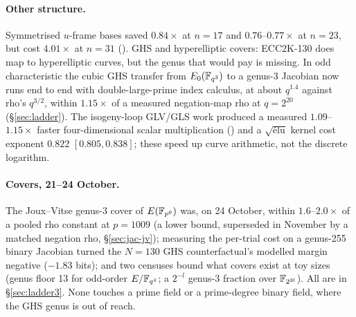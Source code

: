 \paragraph{Other structure.} Symmetrised $u$-frame bases saved
$0.84\times$ at $n=17$ and $0.76$--$0.77\times$ at $n=23$, but cost
$4.01\times$ at $n=31$ ().
GHS and hyperelliptic covers: ECC2K-130 does map to hyperelliptic curves,
but the genus that would pay is missing. In odd characteristic the cubic
GHS transfer from $E_0(\mathbb{F}_{q^3})$ to a genus-3 Jacobian now runs end to end
with double-large-prime index calculus, at about $q^{1.4}$ against rho's
$q^{3/2}$, within $1.15\times$ of a measured negation-map rho at
$q=2^{20}$ (\S\ref{sec:ladder}). The
isogeny-loop GLV/GLS work produced a measured $1.09$--$1.15\times$ faster
four-dimensional scalar multiplication ()
and a $\sqrt{\text{\'elu}}$ kernel cost exponent $0.822$ $[0.805,0.838]$;
these speed up curve arithmetic, not the discrete logarithm.

\paragraph{Covers, 21--24 October.} The Joux--Vitse genus-3 cover of
$E(\mathbb{F}_{p^6})$ was, on 24 October, within $1.6$--$2.0\times$ of a pooled rho
constant at $p=1009$ (a lower bound, superseded in November by a matched
negation rho, \S\ref{sec:jac-jv}); measuring the per-trial cost on a genus-255 binary Jacobian
turned the $N=130$ GHS counterfactual's modelled margin negative ($-1.83$
bits); and two censuses bound what covers exist at toy sizes (genus floor 13
for odd-order $E/\mathbb{F}_{q^4}$; a $2^{-l}$ genus-3 fraction over
$\mathbb{F}_{2^{3l}}$). All are in \S\ref{sec:ladder3}. None touches a prime field
or a prime-degree binary field, where the GHS genus is out of reach.


